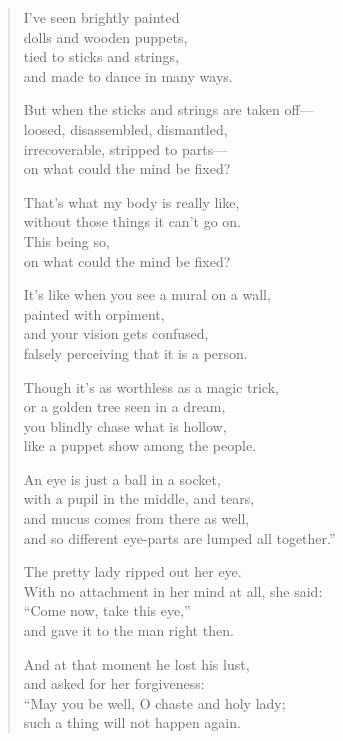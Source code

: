 \documentclass[12pt,openany]{book}%
\begin{document}
\begin{verse}
I’ve seen brightly painted \\
dolls and wooden puppets, \\
tied to sticks and strings, \\
and made to dance in many ways. 

But when the sticks and strings are taken off—\\
loosed, disassembled, dismantled, \\
irrecoverable, stripped to parts—\\
on what could the mind be fixed? 

That’s what my body is really like, \\
without those things it can’t go on. \\
This being so, \\
on what could the mind be fixed? 

It’s like when you see a mural on a wall, \\
painted with orpiment, \\
and your vision gets confused, \\
falsely perceiving that it is a person. 

Though it’s as worthless as a magic trick, \\
or a golden tree seen in a dream, \\
you blindly chase what is hollow, \\
like a puppet show among the people. 

An eye is just a ball in a socket, \\
with a pupil in the middle, and tears, \\
and mucus comes from there as well, \\
and so different eye-parts are lumped all together.” 

The pretty lady ripped out her eye. \\
With no attachment in her mind at all, she said: \\
“Come now, take this eye,” \\
and gave it to the man right then. 

And at that moment he lost his lust, \\
and asked for her forgiveness: \\
“May you be well, O chaste and holy lady; \\
such a thing will not happen again. 


\end{verse}
\end{document}
